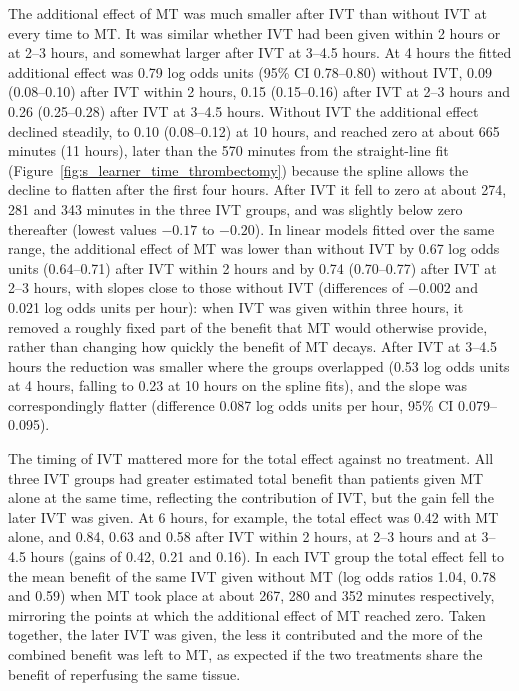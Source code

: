 The additional effect of MT was much smaller after IVT than without IVT at every time to MT. It was similar whether IVT had been given within 2 hours or at 2--3 hours, and somewhat larger after IVT at 3--4.5 hours. At 4 hours the fitted additional effect was 0.79 log odds units (95\% CI 0.78--0.80) without IVT, 0.09 (0.08--0.10) after IVT within 2 hours, 0.15 (0.15--0.16) after IVT at 2--3 hours and 0.26 (0.25--0.28) after IVT at 3--4.5 hours. Without IVT the additional effect declined steadily, to 0.10 (0.08--0.12) at 10 hours, and reached zero at about 665 minutes (11 hours), later than the 570 minutes from the straight-line fit (Figure~\ref{fig:s_learner_time_thrombectomy}) because the spline allows the decline to flatten after the first four hours. After IVT it fell to zero at about 274, 281 and 343 minutes in the three IVT groups, and was slightly below zero thereafter (lowest values $-0.17$ to $-0.20$). In linear models fitted over the same range, the additional effect of MT was lower than without IVT by 0.67 log odds units (0.64--0.71) after IVT within 2 hours and by 0.74 (0.70--0.77) after IVT at 2--3 hours, with slopes close to those without IVT (differences of $-0.002$ and 0.021 log odds units per hour): when IVT was given within three hours, it removed a roughly fixed part of the benefit that MT would otherwise provide, rather than changing how quickly the benefit of MT decays. After IVT at 3--4.5 hours the reduction was smaller where the groups overlapped (0.53 log odds units at 4 hours, falling to 0.23 at 10 hours on the spline fits), and the slope was correspondingly flatter (difference 0.087 log odds units per hour, 95\% CI 0.079--0.095).

The timing of IVT mattered more for the total effect against no treatment. All three IVT groups had greater estimated total benefit than patients given MT alone at the same time, reflecting the contribution of IVT, but the gain fell the later IVT was given. At 6 hours, for example, the total effect was 0.42 with MT alone, and 0.84, 0.63 and 0.58 after IVT within 2 hours, at 2--3 hours and at 3--4.5 hours (gains of 0.42, 0.21 and 0.16). In each IVT group the total effect fell to the mean benefit of the same IVT given without MT (log odds ratios 1.04, 0.78 and 0.59) when MT took place at about 267, 280 and 352 minutes respectively, mirroring the points at which the additional effect of MT reached zero. Taken together, the later IVT was given, the less it contributed and the more of the combined benefit was left to MT, as expected if the two treatments share the benefit of reperfusing the same tissue.

